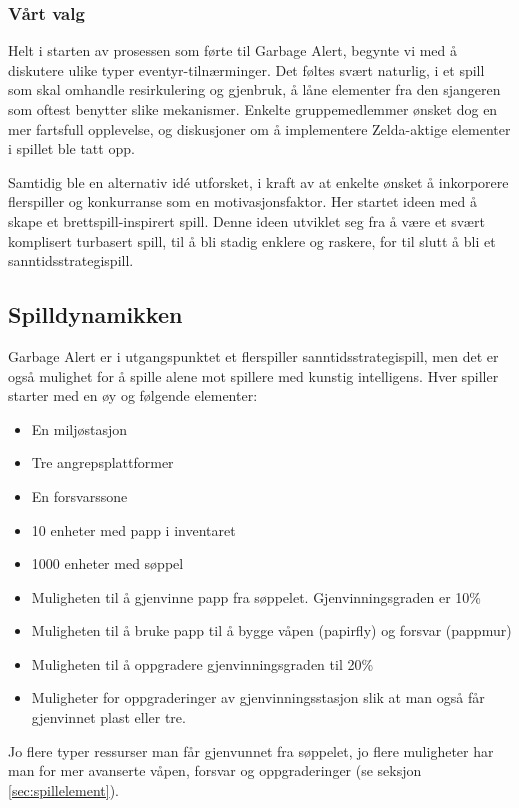 \subsubsection{Vårt valg}
Helt i starten av prosessen som førte til Garbage Alert, begynte vi med å diskutere ulike typer eventyr-tilnærminger. Det føltes svært naturlig, i et spill som skal omhandle resirkulering og gjenbruk, å låne elementer fra den sjangeren som oftest benytter slike mekanismer. Enkelte gruppemedlemmer ønsket dog en mer fartsfull opplevelse, og diskusjoner om å implementere Zelda-aktige elementer i spillet ble tatt opp.

Samtidig ble en alternativ idé utforsket, i kraft av at enkelte ønsket å inkorporere flerspiller og konkurranse som en motivasjonsfaktor. Her startet ideen med å skape et brettspill-inspirert spill. Denne ideen utviklet seg fra å være et svært komplisert turbasert spill, til å bli stadig enklere og raskere, for til slutt å bli et sanntidsstrategispill.



\subsection{Spilldynamikken}
Garbage Alert er i utgangspunktet et flerspiller sanntidsstrategispill,
men det er også mulighet for å spille alene mot spillere med kunstig
intelligens. Hver spiller starter med en øy og følgende elementer:
\begin{itemize}
	\item En miljøstasjon
	\item Tre angrepsplattformer
	\item En forsvarssone
	\item 10 enheter med papp i inventaret
	\item 1000 enheter med søppel
	\item Muligheten til å gjenvinne papp fra søppelet. Gjenvinningsgraden er 10\%
	\item Muligheten til å bruke papp til å bygge våpen (papirfly) og forsvar (pappmur)
	\item Muligheten til å oppgradere gjenvinningsgraden til 20\%
	\item Muligheter for oppgraderinger av gjenvinningsstasjon slik at man også får gjenvinnet plast eller tre.
\end{itemize}

Jo flere typer ressurser man får gjenvunnet fra søppelet, jo flere muligheter har man for mer avanserte våpen, forsvar og oppgraderinger (se seksjon \ref{sec:spillelement}).

